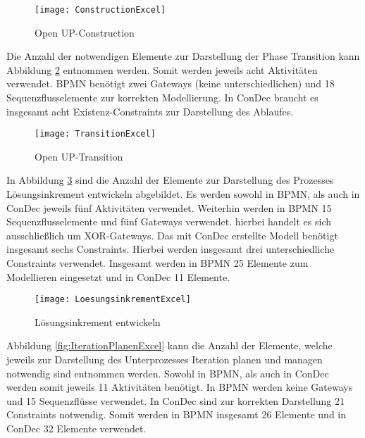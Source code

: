 \begin{figure}[htp]
\begin{center}
  \texttt{[image: ConstructionExcel]} %
  \caption{Open UP-Construction}
  \label{fig:ConstructionExcel}
\end{center}
\end{figure}

Die Anzahl der notwendigen Elemente zur Darstellung der Phase Transition kann Abbildung \ref{fig:TransitionExcel} entnommen werden. Somit werden jeweils acht Aktivitäten verwendet. BPMN benötigt zwei Gateways (keine unterschiedlichen) und 18 Sequenzflusselemente zur korrekten Modellierung. In ConDec braucht es insgesamt acht Existenz-Constraints zur Darstellung des Ablaufes.\newline

\begin{figure}[htp]
\begin{center}
  \texttt{[image: TransitionExcel]} %
  \caption{Open UP-Transition}
  \label{fig:TransitionExcel}
\end{center}
\end{figure}

In Abbildung \ref{fig:LoesungsinkrementExcel} sind die Anzahl der Elemente zur Darstellung des Prozesses Lösungsinkrement entwickeln abgebildet. Es werden sowohl in BPMN, als auch in ConDec jeweils fünf Aktivitäten verwendet. Weiterhin werden in BPMN 15 Sequenzflusselemente und fünf Gateways verwendet. hierbei handelt es sich ausschließlich um XOR-Gateways. Das mit ConDec erstellte Modell benötigt insgesamt sechs Constraints. Hierbei werden insgesamt drei unterschiedliche Constraints verwendet. Insgesamt werden in BPMN 25 Elemente zum Modellieren eingesetzt und in ConDec 11 Elemente.\newline

\begin{figure}[htp]
\begin{center}
  \texttt{[image: LoesungsinkrementExcel]} %
  \caption{Lösungsinkrement entwickeln}
  \label{fig:LoesungsinkrementExcel}
\end{center}
\end{figure}


Abbildung \ref{fig:IterationPlanenExcel} kann die Anzahl der Elemente, welche jeweils zur Darstellung des Unterprozesses Iteration planen und managen notwendig sind entnommen werden. Sowohl in BPMN, als auch in ConDec werden somit jeweils 11 Aktivitäten benötigt. In BPMN werden keine Gateways und 15 Sequenzflüsse verwendet. In ConDec sind zur korrekten Darstellung 21 Constraints notwendig. Somit werden in BPMN insgesamt 26 Elemente und in ConDec 32 Elemente verwendet.\newline

